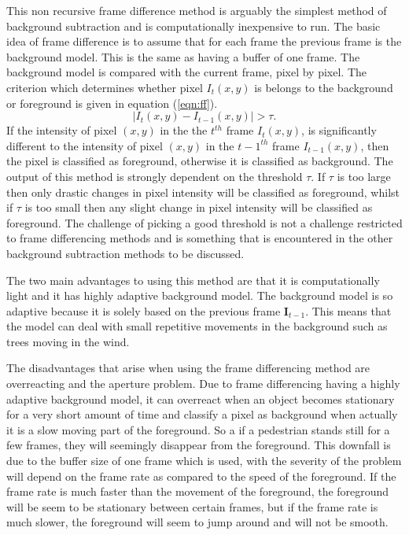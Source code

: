 This non recursive frame difference method is arguably the simplest method of background subtraction and is computationally inexpensive to run. The basic idea of frame difference is to assume that for each frame the previous frame is the background model. This is the same as having a buffer of one frame. The background model is compared with the current frame, pixel by pixel. The criterion which determines whether pixel $I_t(x,y)$ is belongs to the background or foreground is given in equation (\ref{eqn:ff}).
%
\begin{equation}
  |I_t(x,y) - I_{t-1}(x,y)| > \tau.
\label{eqn:ff}
\end{equation}
%
 If the intensity of pixel $(x,y)$ in the the $t^{th}$ frame  $I_t(x,y)$, is significantly different to the intensity of pixel $(x,y)$ in the ${t-1}^{th}$ frame $I_{t-1}(x,y)$, then the pixel is classified as foreground, otherwise it is classified as background. The output of this method is strongly dependent on the threshold $\tau$. If $\tau$ is too large then only drastic changes in pixel intensity will be classified as foreground, whilst if $\tau$ is too small then any slight change in pixel intensity will be classified as foreground. The challenge of picking a good threshold is not a challenge restricted to frame differencing methods and is something that is encountered in the other background subtraction methods to be discussed. 

The two main advantages to using this method are that it is computationally light and it has highly adaptive background model. The background model is so adaptive because it is solely based on the previous frame $\pmb{I}_{t-1}$. This means that the model can deal with small repetitive movements in the background such as trees moving in the wind.

The disadvantages that arise when using the frame differencing method are overreacting and the aperture problem. Due to frame differencing having a highly adaptive background model, it can overreact when an object becomes stationary for a very short amount of time and classify a pixel as background when actually it is a slow moving part of the foreground. So a if a pedestrian stands still for a few frames, they will seemingly disappear from the foreground. This downfall is due to the buffer size of one frame which is used, with the severity of the problem will depend on the frame rate as compared to the speed of the foreground. If the frame rate is much faster than the movement of the foreground, the foreground will be seem to be stationary between certain frames, but if the frame rate is much slower, the foreground will seem to jump around and will not be smooth. 

